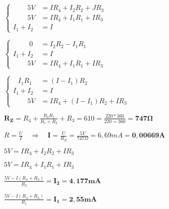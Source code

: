 \documentclass[12pt]{article}
\begin{document}



$ \begin{cases} 
\phantom{I_1 + }
	   5V& = IR_4 + I_2R_2 + JR_3\\
\phantom{I_1 + }
	   5V& = IR_4 + I_1R_1 + IR_3\\
I_1 + I_2& = I
\end{cases} $

\bigbreak
\bigbreak

$ \begin{cases}
\phantom{I_1 + .}
		0 &= I_2R_2 - I_1R_1\\
I_1 + I_2 &= I\\
\phantom{I_1 + }
	   5V &= IR_4 + I_1R_1 + IR_3
\end{cases} $

\bigbreak
\bigbreak

$ \begin{cases}
\phantom{I. }
   I_1R_1 &= (I - I_1)R_2\\
I_1 + I_2 &= I\\
\phantom{I_1 + }
	   5V &= IR_4 + (I - I_1)R_2 + IR_3
\end{cases} $

\bigbreak
\bigbreak


$\bm{R_Z} = R_4 + \frac{R_2R_1}{R_1 + R_2} + R_3 = 610 = \frac{220*360}{220 = 360} = \bm{747\Omega}$
\bigbreak

$R = \frac{U}{I}\quad\Rightarrow\quad \bm{I} = \frac{U}{R_Z} = \frac{5V}{747\Omega} = 6,69mA = \bm{0,00669A}$
\bigbreak
\bigbreak

$5V = IR_4 + I_2R_2 + IR_3$
\bigbreak

$5V = IR_4 + I_1R_1 + IR_3$
\bigbreak
\bigbreak

$\frac{5V - I(R_4 + R_3)}{R_2} = \bm{I_2 = 4,177mA}$
\bigbreak

$\frac{5V - I(R_4 + R_3)}{R_1} = \bm{I_1 = 2,55mA}$
\end{document}
